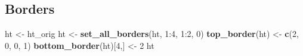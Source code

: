 \documentclass[]{article}
\newenvironment{Shaded}{\begin{snugshade}}{\end{snugshade}}
\newcommand{\KeywordTok}[1]{\textcolor[rgb]{0.13,0.29,0.53}{\textbf{{#1}}}}
\newcommand{\DecValTok}[1]{\textcolor[rgb]{0.00,0.00,0.81}{{#1}}}
\newcommand{\StringTok}[1]{\textcolor[rgb]{0.31,0.60,0.02}{{#1}}}
\newcommand{\NormalTok}[1]{{#1}}
\begin{document}
\FloatBarrier

\subsection{Borders}\label{borders}

\begin{Shaded}
\begin{Highlighting}[]
\NormalTok{ht <-}\StringTok{ }\NormalTok{ht_orig}
\NormalTok{ht <-}\StringTok{ }\KeywordTok{set_all_borders}\NormalTok{(ht, }\DecValTok{1}\NormalTok{:}\DecValTok{4}\NormalTok{, }\DecValTok{1}\NormalTok{:}\DecValTok{2}\NormalTok{, }\DecValTok{0}\NormalTok{)}
\KeywordTok{top_border}\NormalTok{(ht) <-}\StringTok{ }\KeywordTok{c}\NormalTok{(}\DecValTok{2}\NormalTok{, }\DecValTok{0}\NormalTok{, }\DecValTok{0}\NormalTok{, }\DecValTok{1}\NormalTok{)}
\KeywordTok{bottom_border}\NormalTok{(ht)[}\DecValTok{4}\NormalTok{,] <-}\StringTok{ }\DecValTok{2} 
\NormalTok{ht}
\end{Highlighting}
\end{Shaded}
\end{document}
